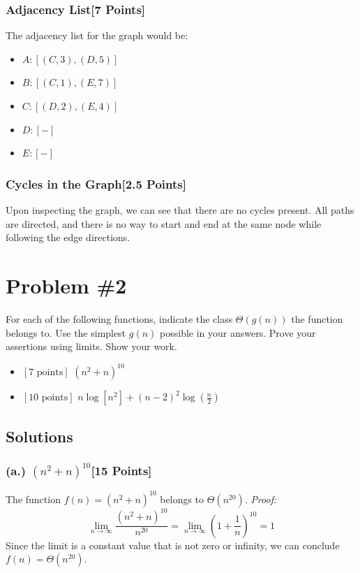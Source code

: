 \documentclass{article}
\begin{document}
\subsubsection*{Adjacency List[7 Points]}

The adjacency list for the graph would be:

\begin{itemize}
    \item \(A: [(C, 3), (D, 5)]\)
    \item \(B: [(C, 1), (E, 7)]\)
    \item \(C: [(D, 2), (E, 4)]\)
    \item \(D: [ - ]\)
    \item \(E: [ - ]\)
\end{itemize}

\subsubsection*{Cycles in the Graph[2.5 Points]}

Upon inspecting the graph, we can see that there are no cycles present. All paths are directed, and there is no way to start and end at the same node while following the edge directions.

\newpage
\section*{Problem \#2}
For each of the following functions, indicate the class \( \Theta(g(n)) \) the function belongs to. Use the simplest \( g(n) \) possible in your answers. Prove your assertions using limits. Show your work.

\begin{itemize}
    \item \([7 \text{ points}]\) \( (n^2+n)^{10} \)
    \item \([10 \text{ points}]\) \( n \log[n^2]+(n-2)^2 \log \left( \frac{n}{2} \right) \)
\end{itemize}

\subsection*{Solutions}
\subsubsection*{(a.) \( (n^2+n)^{10} \)[15 Points]}
The function \( f(n) = (n^2+n)^{10} \) belongs to \( \Theta(n^{20}) \).
\newline
\textit{Proof:}
\[
\lim_{{n \to \infty}} \frac{(n^2+n)^{10}}{n^{20}} = \lim_{{n \to \infty}} \left( 1+\frac{1}{n} \right)^{10} = 1
\]
\newline
Since the limit is a constant value that is not zero or infinity, we can conclude \( f(n) = \Theta(n^{20}) \).
\newline
\newline
\end{document}
